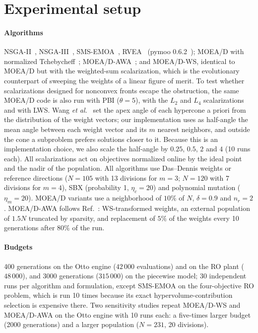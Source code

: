\documentclass[journal]{IEEEtran}
\theoremstyle{remark}
\begin{document}
\section{Experimental setup}
\label{sec:setup}

\paragraph*{Algorithms} NSGA-II~\cite{Deb2002}, NSGA-III~\cite{DebJain2014},
SMS-EMOA~\cite{Beume2007}, RVEA~\cite{Cheng2016} (pymoo 0.6.2~\cite{Blank2020}); MOEA/D with
normalized Tchebycheff~\cite{ZhangLi2007}; MOEA/D-AWA~\cite{Qi2014}; and MOEA/D-WS, identical to
MOEA/D but with the weighted-sum scalarization, which is the evolutionary counterpart of sweeping the
weights of a linear figure of merit. To test whether scalarizations designed for nonconvex fronts
escape the obstruction, the same MOEA/D code is also run with PBI ($\theta = 5$), with the $L_2$ and
$L_4$ scalarizations and with LWS. Wang \emph{et al.}~\cite{WangLWS2018} set the apex angle of each
hypercone a priori from the distribution of the weight vectors; our implementation uses as half-angle the
mean angle between each weight vector and its $m$ nearest neighbors, and outside the cone a subproblem
prefers solutions closer to it. Because this is an implementation choice, we also scale the half-angle by
$0.25$, $0.5$, $2$ and $4$ (10 runs each). All
scalarizations act on objectives normalized online by the ideal point and the nadir of the population.
All algorithms use Das--Dennis weights or reference directions ($N = 105$ with 13 divisions for $m = 3$;
$N = 120$ with 7 divisions for $m = 4$), SBX (probability 1, $\eta_c = 20$) and polynomial mutation
($\eta_m = 20$). MOEA/D variants use a neighborhood of $10\%$ of $N$, $\delta = 0.9$ and $n_r = 2$.
MOEA/D-AWA follows Ref.~\cite{Qi2014}: WS-transformed weights, an external population of $1.5N$
truncated by sparsity, and replacement of $5\%$ of the weights every 10 generations after $80\%$ of the
run.

\paragraph*{Budgets} 400 generations on the Otto engine ($42\,000$ evaluations) and on the RO plant
($48\,000$), and 3000 generations ($315\,000$) on the piecewise model; 30 independent runs per algorithm
and formulation, except SMS-EMOA on the four-objective RO problem, which is run 10 times because its
exact hypervolume-contribution selection is expensive there. Two sensitivity studies repeat MOEA/D-WS and
MOEA/D-AWA on the Otto engine with 10 runs each: a five-times larger budget (2000 generations) and a
larger population ($N = 231$, 20 divisions).
\end{document}
